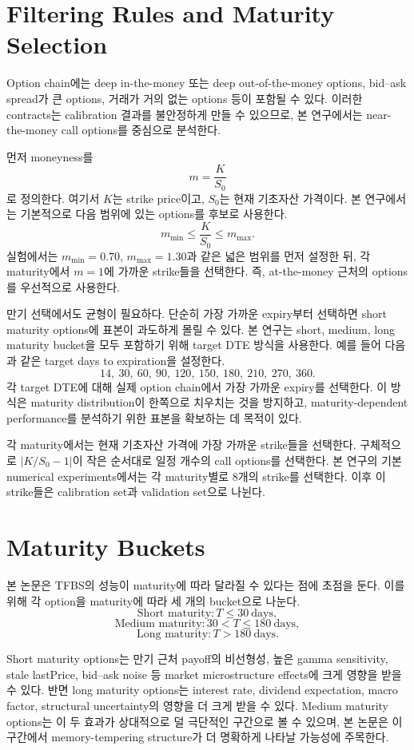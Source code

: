 \documentclass[11pt,a4paper]{report}
\begin{document}
\section{Filtering Rules and Maturity Selection}

Option chain에는 deep in-the-money 또는 deep out-of-the-money options, bid--ask spread가 큰 options, 거래가 거의 없는 options 등이 포함될 수 있다. 이러한 contracts는 calibration 결과를 불안정하게 만들 수 있으므로, 본 연구에서는 near-the-money call options를 중심으로 분석한다.

먼저 moneyness를
\[
m = \frac{K}{S_0}
\]
로 정의한다. 여기서 $K$는 strike price이고, $S_0$는 현재 기초자산 가격이다. 본 연구에서는 기본적으로 다음 범위에 있는 options를 후보로 사용한다.
\[
m_{\min} \leq \frac{K}{S_0} \leq m_{\max}.
\]
실험에서는 $m_{\min}=0.70$, $m_{\max}=1.30$과 같은 넓은 범위를 먼저 설정한 뒤, 각 maturity에서 $m=1$에 가까운 strike들을 선택한다. 즉, at-the-money 근처의 options를 우선적으로 사용한다.

만기 선택에서도 균형이 필요하다. 단순히 가장 가까운 expiry부터 선택하면 short maturity options에 표본이 과도하게 몰릴 수 있다. 본 연구는 short, medium, long maturity bucket을 모두 포함하기 위해 target DTE 방식을 사용한다. 예를 들어 다음과 같은 target days to expiration을 설정한다.
\[
14,\ 30,\ 60,\ 90,\ 120,\ 150,\ 180,\ 210,\ 270,\ 360.
\]
각 target DTE에 대해 실제 option chain에서 가장 가까운 expiry를 선택한다. 이 방식은 maturity distribution이 한쪽으로 치우치는 것을 방지하고, maturity-dependent performance를 분석하기 위한 표본을 확보하는 데 목적이 있다.

각 maturity에서는 현재 기초자산 가격에 가장 가까운 strike들을 선택한다. 구체적으로 $|K/S_0-1|$이 작은 순서대로 일정 개수의 call options를 선택한다. 본 연구의 기본 numerical experiments에서는 각 maturity별로 8개의 strike를 선택한다. 이후 이 strike들은 calibration set과 validation set으로 나뉜다.

\section{Maturity Buckets}

본 논문은 TFBS의 성능이 maturity에 따라 달라질 수 있다는 점에 초점을 둔다. 이를 위해 각 option을 maturity에 따라 세 개의 bucket으로 나눈다.
\[
\text{Short maturity}
:
T\le 30\ \text{days},
\]
\[
\text{Medium maturity}
:
30<T\le 180\ \text{days},
\]
\[
\text{Long maturity}
:
T>180\ \text{days}.
\]

Short maturity options는 만기 근처 payoff의 비선형성, 높은 gamma sensitivity, stale lastPrice, bid--ask noise 등 market microstructure effects에 크게 영향을 받을 수 있다. 반면 long maturity options는 interest rate, dividend expectation, macro factor, structural uncertainty의 영향을 더 크게 받을 수 있다. Medium maturity options는 이 두 효과가 상대적으로 덜 극단적인 구간으로 볼 수 있으며, 본 논문은 이 구간에서 memory-tempering structure가 더 명확하게 나타날 가능성에 주목한다.
\end{document}
